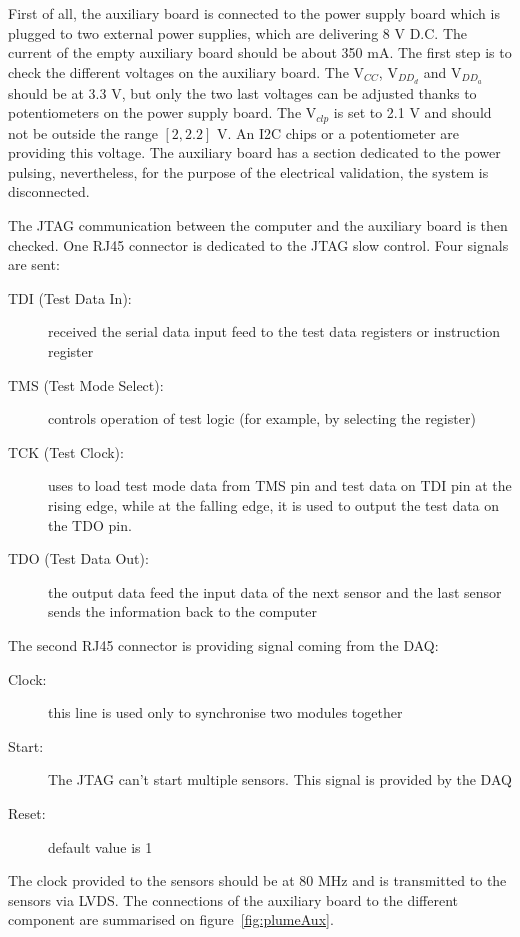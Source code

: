   First of all, the auxiliary board is connected to the power supply board which is plugged to two external power supplies, which are delivering  8 V D.C.
  The current of the empty auxiliary board should be about 350 mA.
  The first step is to check the different voltages on the auxiliary board.
  The $\text{V}_{CC}$, $\text{V}_{DD_d}$ and $\text{V}_{DD_a}$ should be at 3.3 V, but only the two last voltages can be adjusted thanks to potentiometers on the power supply board.
  The $\text{V}_{clp}$ is set to 2.1 V and should not be outside the range $\left[2, 2.2\right]$ V.
  An I2C chips or a potentiometer are providing this voltage.
  The auxiliary board has a section dedicated to the power pulsing, nevertheless, for the purpose of the electrical validation, the system is disconnected.

  The JTAG communication between the computer and the auxiliary board is then checked.
  One RJ45 connector is dedicated to the JTAG slow control. 
  Four signals are sent:
  \begin{description}
    \item[TDI (Test Data In):] received the serial data input feed to the test data registers or instruction register
    \item[TMS (Test Mode Select):] controls operation of test logic (for example, by selecting the register)
    \item[TCK (Test Clock):] uses to load test mode data from TMS pin and test data on TDI pin at the rising edge, while at the falling edge, it is used to output the test data on the TDO pin.
    \item[TDO (Test Data Out):] the output data feed the input data of the next sensor and the last sensor sends the information back to the computer 
  \end{description}

  The second RJ45 connector is providing signal coming from the DAQ:
  \begin{description}
    \item[Clock:] this line is used only to synchronise two modules together
    \item[Start:] The JTAG can't start multiple sensors. This signal is provided by the DAQ
    \item[Reset:] default value is 1 
  \end{description}

  The clock provided to the sensors should be at 80 MHz and is transmitted to the sensors via LVDS.
  The connections of the auxiliary board to the different component are summarised on figure~\ref{fig:plumeAux}.

